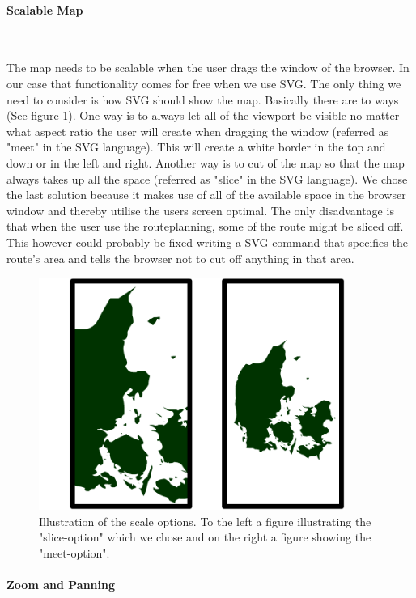 \documentclass[a4paper,10pt,titlepage]{article}
\begin{document}
\paragraph{Scalable Map}\mbox{}\

The map needs to be scalable when the user drags the window of the browser. In our case that functionality comes for free when we use SVG. The only thing we need to consider is how SVG should show the map. Basically there are to ways (See figure \ref{fig:mapSliceMeet}). One way is to always let all of the viewport be visible no matter what aspect ratio the user will create when dragging the window (referred as "meet" in the SVG language). This will create a white border in the top and down or in the left and right. Another way is to cut of the map so that the map always takes up all the space (referred as "slice" in the SVG language). We chose the last solution because it makes use of all of the available space in the browser window and thereby utilise the users screen optimal. The only disadvantage is that when the user use the routeplanning, some of the route might be sliced off. This however could probably be fixed writing a SVG command that specifies the route's area and tells the browser not to cut off anything in that area.
\begin{figure}[H]
\includegraphics[width=100mm]{mapSliceMeet.png}
\caption{Illustration of the scale options. To the left a figure illustrating the "slice-option" which we chose and on the right a figure showing the "meet-option".}
\label{fig:mapSliceMeet}
\end{figure}


\paragraph{Zoom and Panning}\mbox{}\
\end{document}
